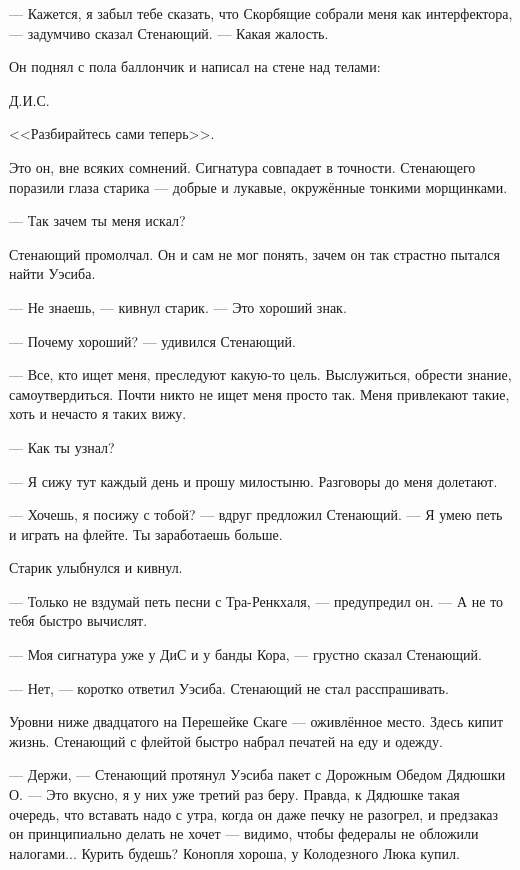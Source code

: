 --- Кажется, я забыл тебе сказать, что Скорбящие собрали меня как интерфектора, --- задумчиво сказал Стенающий.
--- Какая жалость.

Он поднял с пола баллончик и написал на стене над телами:

Д.И.С.

<<Разбирайтесь сами теперь>>.

\razd

Это он, вне всяких сомнений.
Сигнатура совпадает в точности.
Стенающего поразили глаза старика --- добрые и лукавые, окружённые тонкими морщинками.

--- Так зачем ты меня искал?

Стенающий промолчал.
Он и сам не мог понять, зачем он так страстно пытался найти Уэсиба.

--- Не знаешь, --- кивнул старик.
--- Это хороший знак.

--- Почему хороший? --- удивился Стенающий.

--- Все, кто ищет меня, преследуют какую-то цель.
Выслужиться, обрести знание, самоутвердиться.
Почти никто не ищет меня просто так.
Меня привлекают такие, хоть и нечасто я таких вижу.

--- Как ты узнал?

--- Я сижу тут каждый день и прошу милостыню.
Разговоры до меня долетают.

--- Хочешь, я посижу с тобой? --- вдруг предложил Стенающий.
--- Я умею петь и играть на флейте.
Ты заработаешь больше.

Старик улыбнулся и кивнул.

--- Только не вздумай петь песни с Тра-Ренкхаля, --- предупредил он.
--- А не то тебя быстро вычислят.

--- Моя сигнатура уже у ДиС и у банды Кора, --- грустно сказал Стенающий.

--- Нет, --- коротко ответил Уэсиба.
Стенающий не стал расспрашивать.

\razd

Уровни ниже двадцатого на Перешейке Скаге --- оживлённое место.
Здесь кипит жизнь.
Стенающий с флейтой быстро набрал печатей на еду и одежду.

--- Держи, --- Стенающий протянул Уэсиба пакет с Дорожным Обедом Дядюшки О.
--- Это вкусно, я у них уже третий раз беру.
Правда, к Дядюшке такая очередь, что вставать надо с утра, когда он даже печку не разогрел, и предзаказ он принципиально делать не хочет --- видимо, чтобы федералы не обложили налогами...
Курить будешь?
Конопля хороша, у Колодезного Люка купил.

